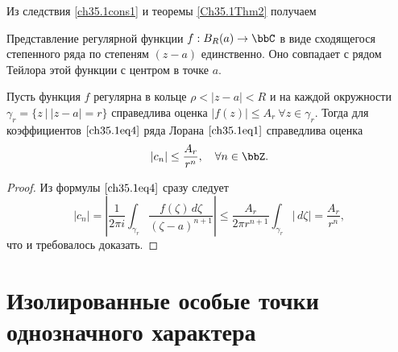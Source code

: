 Из следствия \ref{ch35.1cons1} и теоремы \ref{Ch35.1Thm2} получаем

\begin{cons}
Представление регулярной функции $f : B_R(a) \to \bbC$ в виде сходящегося степенного ряда по степеням $(z - a)$ единственно. Оно совпадает с рядом Тейлора этой функции с центром в точке $a$.
\end{cons}

\begin{cons}  \label{ch35.1cons3}
Пусть функция $f$ регулярна в кольце $\rho < |z - a| < R$ и на каждой окружности $\gamma_r = \{ z \: \big| \: |z - a| = r\}$ справедлива оценка $|f(z)| \le A_r \: \forall z \in \gamma_r$. Тогда для коэффициентов $\eqref{ch35.1eq4}$ ряда Лорана $\eqref{ch35.1eq1}$ справедлива оценка
\begin{equation} \label{ch35.1eq20}
|c_n| \le \frac{A_r}{r^n}, \quad \forall n \in \bbZ.
\end{equation}

\begin{proof}
Из формулы $\eqref{ch35.1eq4}$ сразу следует
$$
|c_n| = \left| \frac{1}{2\pi i} \int_{\gamma_r} \frac{f(\zeta)\,d\zeta}{(\zeta - a)^{n + 1}} \right| \le \frac{A_r}{2\pi r^{n + 1}} \int_{\gamma_r} |\,d\zeta| = \frac{A_r}{r^n},
$$
что и требовалось доказать.
\end{proof}
\end{cons}

\section{Изолированные особые точки однозначного характера}

